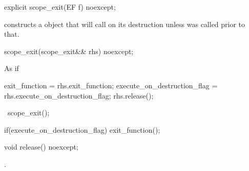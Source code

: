 \documentclass[ebook,11pt,article]{memoir}
\begin{document}
\begin{itemdecl}
explicit
scope_exit(EF f) noexcept;
\end{itemdecl}

\begin{itemdescr}
\pnum
\effects constructs a  object that will call  on its destruction unless  was called prior to that.
\end{itemdescr}

\begin{itemdecl}
scope_exit(scope_exit&& rhs) noexcept;
\end{itemdecl}

\begin{itemdescr}
\pnum
\effects As if
\begin{codeblock}
  exit_function = rhs.exit_function;
  execute_on_destruction_flag = rhs.execute_on_destruction_flag;
  rhs.release();
\end{codeblock}
\end{itemdescr}

\begin{itemdecl}
~scope_exit();
\end{itemdecl}

\begin{itemdescr}
\pnum
\effects 
\begin{codeblock}
  if(execute_on_destruction_flag)
    exit_function();
\end{codeblock}
\end{itemdescr}

\begin{itemdecl}
void release() noexcept;
\end{itemdecl}

\begin{itemdescr}
\pnum
\effects {}.
\end{itemdescr}


\end{document}
